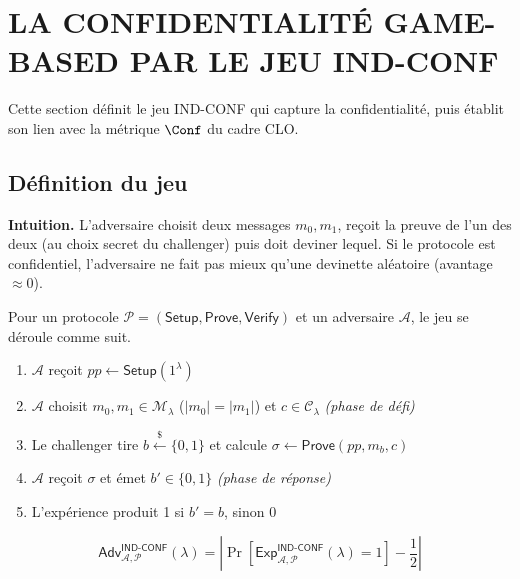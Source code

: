 \section{LA CONFIDENTIALIT\'E GAME-BASED PAR LE JEU IND-CONF}
\label{sec:gamebased_confidentialite}
\begin{sloppypar}

Cette section d\'efinit le jeu IND-CONF qui capture la confidentialit\'e, puis
\'etablit son lien avec la m\'etrique $\Conf$ du cadre CLO.

\subsection{D\'efinition du jeu}

\noindent\textbf{Intuition.} L'adversaire choisit deux messages
$m_0, m_1$, re\c{c}oit la preuve de l'un des deux (au choix secret du
challenger) puis doit deviner lequel. Si le protocole est confidentiel,
l'adversaire ne fait pas mieux qu'une devinette al\'eatoire
(avantage $\approx 0$).

\begin{definition}\label{def:ann_ind_conf}
Pour un protocole $\mathcal{P} = (\mathsf{Setup},\mathsf{Prove},
\mathsf{Verify})$ et un adversaire $\mathcal{A}$, le jeu se d\'eroule comme suit.
\begin{enumerate}
\item $\mathcal{A}$ reçoit $pp \leftarrow \mathsf{Setup}(1^\lambda)$
\item $\mathcal{A}$ choisit $m_0,m_1 \in \mathcal{M}_\lambda$
      ($|m_0|=|m_1|$) et $c \in \mathcal{C}_\lambda$
      \hfill\textit{(phase de défi)}
\item Le challenger tire $b \xleftarrow{\$} \{0,1\}$ et calcule
      $\sigma \leftarrow \mathsf{Prove}(pp, m_b, c)$
\item $\mathcal{A}$ reçoit $\sigma$ et émet $b' \in \{0,1\}$
      \hfill\textit{(phase de réponse)}
\item L'expérience produit 1 si $b' = b$, sinon 0
\end{enumerate}
\begin{equation}
\mathsf{Adv}^{\mathsf{IND\text{-}CONF}}_{\mathcal{A},\mathcal{P}}(\lambda)
= \left|\Pr\!\left[
\mathsf{Exp}^{\mathsf{IND\text{-}CONF}}_{\mathcal{A},\mathcal{P}}(\lambda)
= 1\right] - \frac{1}{2}\right|
\end{equation}
\end{definition}


\end{sloppypar}
